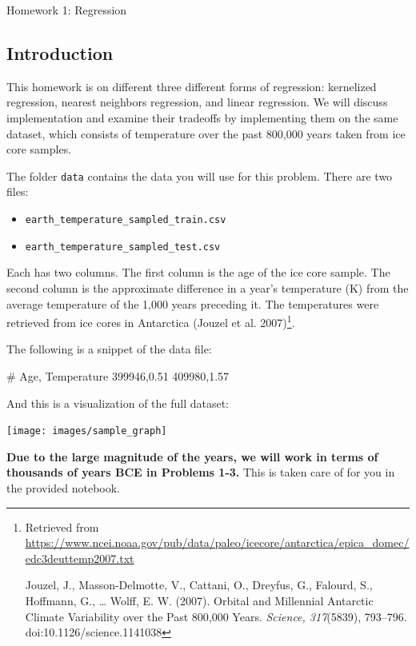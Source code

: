 \documentclass[submit]{harvardml}
\begin{document}
\begin{center}
{\Large Homework 1: Regression}\\
\end{center}

\subsection*{Introduction}
This homework is on different three different forms of regression:
kernelized regression, nearest neighbors regression, and linear
regression.  We will discuss implementation and examine their
tradeoffs by implementing them on the same dataset, which consists of
temperature over the past 800,000 years taken from ice core samples.

The folder \verb|data| contains the data you will use for this
problem. There are two files:
\begin{itemize}
    \item \verb|earth_temperature_sampled_train.csv| 
    \item \verb|earth_temperature_sampled_test.csv|
\end{itemize} 

Each has two columns.  The first column is the age of the ice core
sample.  The second column is the approximate difference in a year's temperature (K) 
from the average temperature of the 1,000 years preceding it. The temperatures were retrieved from ice cores in
Antarctica (Jouzel et al. 2007)\footnote{Retrieved from
\url{https://www.ncei.noaa.gov/pub/data/paleo/icecore/antarctica/epica_domec/edc3deuttemp2007.txt}

Jouzel, J., Masson-Delmotte, V., Cattani, O., Dreyfus, G., Falourd, 
S., Hoffmann, G., … Wolff, E. W. (2007). Orbital and Millennial 
Antarctic Climate Variability over the Past 800,000 Years. 
\emph{Science, 317}(5839), 793–796. doi:10.1126/science.1141038}.
 
The following is a snippet of the data file:
 
\begin{csv}
# Age, Temperature
399946,0.51
409980,1.57
\end{csv}

\noindent And this is a visualization of the full dataset: 
\begin{center}
  \texttt{[image: images/sample\_graph]}
    \end{center}
  \noindent 


\textbf{Due to the large magnitude of the years, we will work in terms
  of thousands of years BCE in Problems 1-3.} This is taken care of
for you in the provided notebook.
\end{document}
